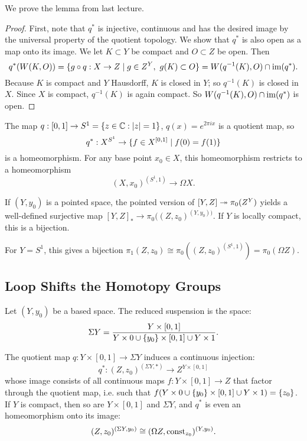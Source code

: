 

We prove the lemma from last lecture.

\begin{proof}
First, note that $q^*$ is injective, continuous and has the desired image by the universal property of the quotient topology. We show that $q^*$ is also open as a map onto its image. We let $K\subset Y$ be compact and $O\subset Z$ be open. Then
\[q^*(W(K,O))=\{g\circ q:X\to Z\mid g\in Z^Y,\ g(K)\subset O\}=W(q^{-1}(K),O)\cap\operatorname{im}(q^*).\]
Because $K$ is compact and $Y$ Hausdorff, $K$ is closed in $Y$; so $q^{-1}(K)$ is closed in $X$. Since $X$ is compact, $q^{-1}(K)$ is again compact. So $W(q^{-1}(K),O)\cap\operatorname{im}(q^*)$ is open.
\end{proof}

\begin{example}
The map $q:[0,1]\to S^1=\{z\in\mathbb{C}:|z|=1\}$, $q(x)=e^{2\pi ix}$ is a quotient map, so
\[q^*:X^{S^1}\to\{f\in X^{[0,1]}\mid f(0)=f(1)\}\]
is a homeomorphism. For any base point $x_0\in X$, this homeomorphism restricts to a homeomorphism
\[(X,x_0)^{(S^1,1)}\to\Omega X.\]

If $(Y,y_0)$ is a pointed space, the pointed version of $[Y,Z]\twoheadrightarrow\pi_0(Z^Y)$ yields a well-defined surjective map $[Y,Z]_*\to\pi_0((Z,z_0)^{(Y,y_0))}$. If $Y$ is locally compact, this is a bijection.

For $Y=S^1$, this gives a bijection $\pi_1(Z,z_0)\cong\pi_0((Z,z_0)^{(S^1,1)})=\pi_0(\Omega Z)$.
\end{example}

\subsection{Loop Shifts the Homotopy Groups}

Let $(Y,y_0)$ be a based space. The reduced suspension is the space:
\[\Sigma Y=\frac{Y\times[0,1]}{Y\times 0\cup\{y_0\}\times[0,1]\cup Y\times 1}.\]

The quotient map $q:Y\times[0,1]\to\Sigma Y$ induces a continuous injection:
\[q^*:(Z,z_0)^{(\Sigma Y,*)}\to Z^{Y\times[0,1]}\]
whose image consists of all continuous maps $f:Y\times[0,1]\to Z$ that factor through the quotient map, i.e. such that $f(Y\times 0\cup\{y_0\}\times[0,1]\cup Y\times 1)=\{z_0\}$. If $Y$ is compact, then so are $Y\times[0,1]$ and $\Sigma Y$, and $q^*$ is even an homeomorphism onto its image:
\[(Z,z_0)^{(\Sigma Y,y_0)}\cong(\Omega Z,\operatorname{const}_{z_0})^{(Y,y_0)}.\]

